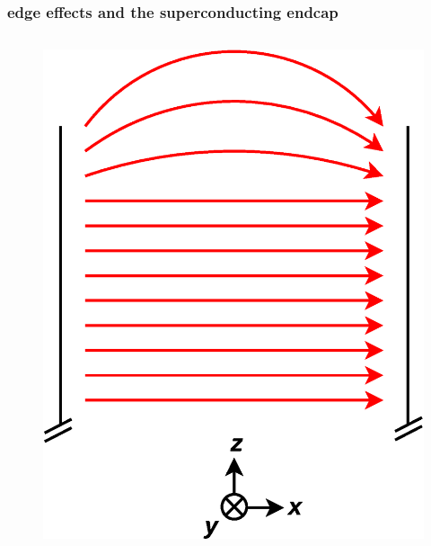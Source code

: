 \documentclass{beamer}
\begin{document}
\begin{frame}
\frametitle{edge effects and the superconducting endcap}

    \begin{columns}[b]
    
    \begin{column}{0.5\textwidth}
    \begin{figure}
    \includegraphics[width=\textwidth]
    {figures/field_noendcap.eps}
    \end{figure}
    \vspace{0pt}
    \end{column}

    \pause


\end{columns}
\end{frame}
\end{document}
